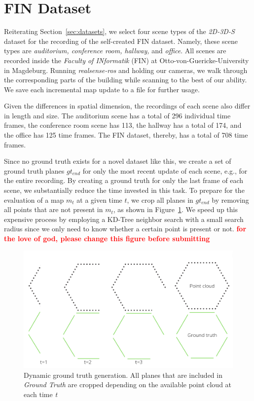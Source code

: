 \documentclass[main.tex]{subfiles}
\begin{document}
\section{FIN Dataset}
\label{sec:finimpl}
Reiterating Section~\ref{sec:datasets}, we select four scene types of the \textit{2D-3D-S} dataset for the recording of the self-created FIN
dataset. Namely, these scene types are \textit{auditorium, conference room, hallway,} and \textit{office}.
All scenes are recorded inside the \textit{Faculty of INformatik} (FIN) at Otto-von-Guericke-University in Magdeburg.
Running \textit{realsense-ros} and holding our cameras, we walk through the corresponding parts of the building while scanning to the best of our ability.
We save each incremental map update to a file for further usage.

Given the differences in spatial dimension, the recordings of each scene also differ in length and size.
The auditorium scene has a total of 296 individual time frames, the conference room scene has 113, the hallway has a total of
174, and the office has 125 time frames.
The FIN dataset, thereby, has a total of 708 time frames.

Since no ground truth exists for a novel dataset like this, we create a set of ground truth planes $gt_{end}$ for only the most recent update of each scene, e.g., for the entire recording.
By creating a ground truth for only the last frame of each scene, we substantially reduce the time invested in this task.
To prepare for the evaluation of a map $m_t$ at a given time $t$, we crop all planes in $gt_{end}$ by removing all points that are not present in $m_t$, as shown in
Figure~\ref{fig:dynGT}.
We speed up this expensive process by employing a KD-Tree neighbor search with a small search radius since we only need to know whether a certain point is present or not.
\textbf{\textcolor{red}{for the love of god, please change this figure before submitting}}
\begin{figure}[H]
    \centering
    \includegraphics[width=15 cm]{images/dynamic_eval.png}
    \caption[Dynamic Ground Truth Generation]{Dynamic ground truth generation. All planes that are included in \textit{Ground Truth} are cropped depending on
        the available point cloud at each time \textit{t} }
    \label{fig:dynGT}
\end{figure}
\end{document}
